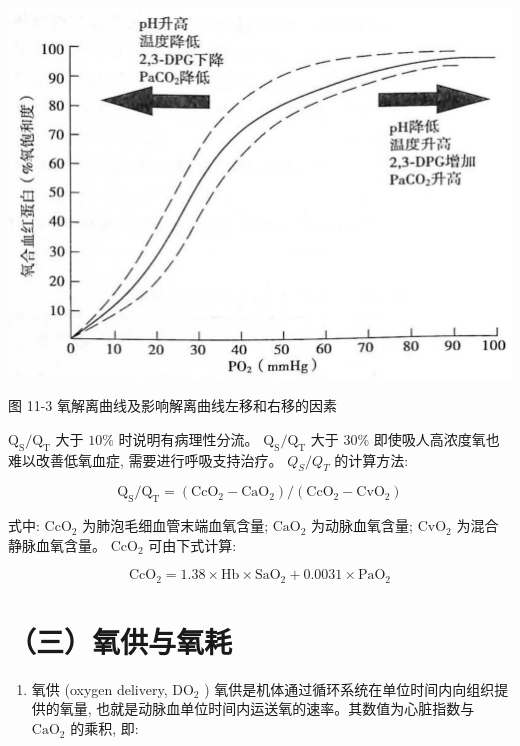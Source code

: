 \documentclass[10pt]{article}
\begin{document}
\begin{center}
\includegraphics[max width=\textwidth]{2024_07_09_002a177993bd97d1d6d7g-121}
\end{center}

图 11-3 氧解离曲线及影响解离曲线左移和右移的因素

$\mathrm{Q}_{\mathrm{S}} / \mathrm{Q}_{\mathrm{T}}$ 大于 $10 \%$ 时说明有病理性分流。 $\mathrm{Q}_{\mathrm{S}} / \mathrm{Q}_{\mathrm{T}}$ 大于 $30 \%$ 即使吸人高浓度氧也难以改善低氧血症, 需要进行呼吸支持治疗。 $Q_{S} / Q_{T}$ 的计算方法:

\[
\mathrm{Q}_{\mathrm{S}} / \mathrm{Q}_{\mathrm{T}}=\left(\mathrm{CcO}_{2}-\mathrm{CaO}_{2}\right) /\left(\mathrm{CcO}_{2}-\mathrm{CvO}_{2}\right)
\]

式中: $\mathrm{CcO}_{2}$ 为肺泡毛细血管末端血氧含量; $\mathrm{CaO}_{2}$ 为动脉血氧含量; $\mathrm{CvO}_{2}$ 为混合静脉血氧含量。 $\mathrm{CcO}_{2}$ 可由下式计算:

\[
\mathrm{CcO}_{2}=1.38 \times \mathrm{Hb} \times \mathrm{SaO}_{2}+0.0031 \times \mathrm{PaO}_{2}
\]

\section*{（三）氧供与氧耗}
\begin{enumerate}
  \item 氧供 (oxygen delivery, $\mathrm{DO}_{2}$ ) 氧供是机体通过循环系统在单位时间内向组织提供的氧量, 也就是动脉血单位时间内运送氧的速率。其数值为心脏指数与 $\mathrm{CaO}_{2}$ 的乘积, 即:
\end{enumerate}
\end{document}
